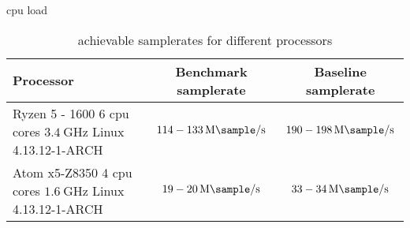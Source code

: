 \begin{subchapter}{\Acrshort{cpu} load}
  \begin{table}[H]
    \centering
    \begin{tabular}{| l | c | c |}
      \hline
      Processor & Benchmark samplerate & Baseline samplerate \\

      \hline
      \parbox[c]{5cm}{\vspace{1mm} Ryzen 5 - 1600 \\ 6 \acrshort{cpu} cores \\ $\SI{3.4}{\giga\hertz}$ \\ Linux 4.13.12-1-ARCH \vspace{1mm}} &
      \parbox[c]{5cm}{\centering $114 - \SI{133}{\mega\sample\per\second}$} &
      \parbox[c]{5cm}{\centering $190 - \SI{198}{\mega\sample\per\second}$} \\

      \hline
      \parbox[c]{5cm}{\vspace{1mm} Atom x5-Z8350 \\ 4 \acrshort{cpu} cores \\ $\SI{1.6}{\giga\hertz}$ \\ Linux 4.13.12-1-ARCH \vspace{1mm}} &
      \parbox[c]{5cm}{\centering $19 - \SI{20}{\mega\sample\per\second}$} &
      \parbox[c]{5cm}{\centering $33 - \SI{34}{\mega\sample\per\second}$} \\

      \hline
    \end{tabular}
    \caption{achievable samplerates for different processors}
    \label{tab:cpuload}
  \end{table}
\end{subchapter}
